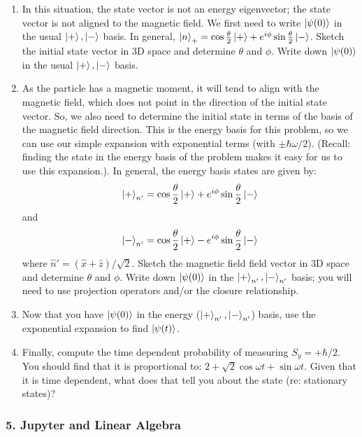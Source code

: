 \documentclass[
]{article}
\providecommand{\tightlist}{%
  \setlength{\itemsep}{0pt}\setlength{\parskip}{0pt}}
\providecommand{\tightlist}{%
  \setlength{\itemsep}{0pt}\setlength{\parskip}{0pt}}
\begin{document}
\begin{enumerate}
\def\labelenumi{\arabic{enumi}.}
\tightlist
\item
  In this situation, the state vector is not an energy eigenvector; the
  state vector is not aligned to the magnetic field. We first need to
  write \(\ket{\psi(0)}\) in the usual \(\ket{+}, \ket{-}\) basis. In
  general,
  \(\ket{n}_+ = \cos\frac{\theta}{2}\ket{+} + e^{i\phi}\sin\frac{\theta}{2}\ket{-}\).
  Sketch the initial state vector in 3D space and determine \(\theta\)
  and \(\phi\). Write down \(\ket{\psi(0)}\) in the usual
  \(\ket{+}, \ket{-}\) basis.
\item
  As the particle has a magnetic moment, it will tend to align with the
  magnetic field, which does not point in the direction of the initial
  state vector. So, we also need to determine the initial state in terms
  of the basis of the magnetic field direction. This is the energy basis
  for this problem, so we can use our simple expansion with exponential
  terms (with \(\pm \hbar \omega/2\)). (Recall: finding the state in the
  energy basis of the problem makes it easy for us to use this
  expansion.). In general, the energy basis states are given by:
  \[\ket{+}_{n'} = \cos\frac{\theta}{2}\ket{+} + e^{i\phi}\sin\frac{\theta}{2}\ket{-}\]
  and
  \[\ket{-}_{n'} = \cos\frac{\theta}{2}\ket{+} - e^{i\phi}\sin\frac{\theta}{2}\ket{-}\]
  where \(\hat{n}' = (\hat{x}+\hat{z})/\sqrt{2}\). Sketch the magnetic
  field field vector in 3D space and determine \(\theta\) and \(\phi\).
  Write down \(\ket{\psi(0)}\) in the \(\ket{+}_{n'}, \ket{-}_{n'}\)
  basis; you will need to use projection operators and/or the closure
  relationship.
\item
  Now that you have \(\ket{\psi(0)}\) in the energy
  (\(\ket{+}_{n'}, \ket{-}_{n'}\)) basis, use the exponential expansion
  to find \(\ket{\psi(t)}\).
\item
  Finally, compute the time dependent probability of measuring
  \(S_y = +\hbar/2\). You should find that it is proportional to:
  \(2 + \sqrt{2}\cos\omega t + \sin \omega t\). Given that it is time
  dependent, what does that tell you about the state (re: stationary
  states)?
\end{enumerate}

\hypertarget{jupyter-and-linear-algebra}{%
\subsubsection{5. Jupyter and Linear
Algebra}\label{jupyter-and-linear-algebra}}
\end{document}
